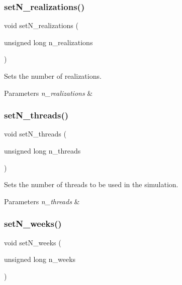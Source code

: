 \subsubsection{\texorpdfstring{set\+N\+\_\+realizations()}{setN\_realizations()}}
{\footnotesize\ttfamily void set\+N\+\_\+realizations (\begin{DoxyParamCaption}\item[{unsigned long}]{n\+\_\+realizations }\end{DoxyParamCaption})}



Sets the number of realizations. 


\begin{DoxyParams}{Parameters}
{\em n\+\_\+realizations} & \\
\hline
\end{DoxyParams}
\mbox{\label{classProblem_ac7a563c47c5a2f5217763b23b5357ecd_ac7a563c47c5a2f5217763b23b5357ecd}} 
\subsubsection{\texorpdfstring{set\+N\+\_\+threads()}{setN\_threads()}}
{\footnotesize\ttfamily void set\+N\+\_\+threads (\begin{DoxyParamCaption}\item[{unsigned long}]{n\+\_\+threads }\end{DoxyParamCaption})}



Sets the number of threads to be used in the simulation. 


\begin{DoxyParams}{Parameters}
{\em n\+\_\+threads} & \\
\hline
\end{DoxyParams}
\mbox{\label{classProblem_a3e8e48d55e03e0f23b303d7b931fa654_a3e8e48d55e03e0f23b303d7b931fa654}} 
\subsubsection{\texorpdfstring{set\+N\+\_\+weeks()}{setN\_weeks()}}
{\footnotesize\ttfamily void set\+N\+\_\+weeks (\begin{DoxyParamCaption}\item[{unsigned long}]{n\+\_\+weeks }\end{DoxyParamCaption})}



